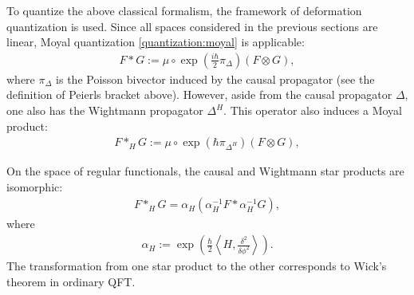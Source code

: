    To quantize the above classical formalism, the framework of deformation quantization is used. Since all spaces considered in the previous sections are linear, Moyal quantization \ref{quantization:moyal} is applicable:
    \begin{gather}
        F\ast G := \mu\circ\exp(\tfrac{i\hbar}{2}\pi_\Delta)(F\otimes G),
    \end{gather}
    where $\pi_\Delta$ is the Poisson bivector induced by the causal propagator (see the definition of Peierls bracket above). However, aside from the causal propagator $\Delta$, one also has the Wightmann propagator $\Delta^H$. This operator also induces a Moyal product:
    \begin{gather}
        \label{aqft:moyal_product}
        F\ast_HG := \mu\circ\exp(\hbar\pi_{\Delta^H})(F\otimes G),
    \end{gather}

    \begin{property}
        On the space of regular functionals, the causal and Wightmann star products are isomorphic:
        \begin{gather}
            F\ast_HG = \alpha_H(\alpha_H^{-1}F\ast\alpha_H^{-1}G),
        \end{gather}
        where
        \begin{gather}
            \alpha_H := \exp\left(\frac{\hbar}{2}\left\langle H,\frac{\delta^2}{\delta\phi^2}\right\rangle\right).
        \end{gather}
        The transformation from one star product to the other corresponds to Wick's theorem in ordinary QFT.
    \end{property}

